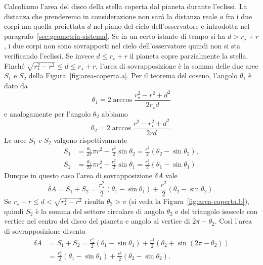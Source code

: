 Calcoliamo l'area del disco della stella coperta dal pianeta durante
l'eclissi. La distanza che prenderemo in considerazione non sarà la distanza
reale $a$ fra i due corpi ma quella proiettata $d$ nel piano del cielo
dell'osservatore e introdotta nel paragrafo~\ref{sec:geometria-sistema}. Se in
un certo istante di tempo si ha $d > r_\star + r$, i due corpi non sono
sovrapposti nel cielo dell'osservatore quindi non si sta verificando
l'eclissi. Se invece $d \leq r_\star + r$ il pianeta copre parzialmente la
stella. Finché $\sqrt{r_\star^2 - r^2} \leq d \leq r_\star + r$, l'area di
sovrapposizione è la somma delle due aree $S_1$ e $S_2$ della
Figura~\ref{fig:area-coperta.a}. Per il teorema del coseno, l'angolo
$\theta_1$ %
è dato da
\begin{equation}
  \theta_1 = 2 \arccos \frac{r_\star^2 - r^2 + d^2}{2r_\star d}
\end{equation}
e analogamente per l'angolo $\theta_2$ abbiamo
\begin{equation}
  \theta_2 = 2 \arccos \frac{r^2 - r_\star^2 + d^2}{2rd}.
\end{equation}
Le aree $S_1$ e $S_2$ valgono rispettivamente
\begin{subequations}
  \begin{align}
    S_1 &= \frac{\theta_2}{2\pi}\pi r^2 - \frac{r^2}{2}\sin\theta_2 =
    \frac{r^2}{2}(\theta_2 - \sin\theta_2), \\
    S_2 &= \frac{\theta_1}{2\pi}\pi r_\star^2 - \frac{r_\star^2}{2}\sin\theta_1
    = \frac{r_\star^2}{2}(\theta_1 - \sin\theta_1).
  \end{align}
\end{subequations}
Dunque in questo caso l'area di sovrapposizione $\delta A$ vale
\begin{equation}
  \delta A = S_1 + S_2 = \frac{r_\star^2}{2}(\theta_1 - \sin\theta_1) +
  \frac{r^2}{2}(\theta_2 - \sin\theta_2).
\end{equation}
Se $r_\star - r \leq d < \sqrt{r_\star^2 - r^2}$ risulta $\theta_2 > \pi$ (si
veda la Figura~\ref{fig:area-coperta.b}), quindi $S_2$ è la somma del settore
circolare di angolo $\theta_2$ e del triangolo isoscele con vertice nel centro
del disco del pianeta e angolo al vertice di $2\pi - \theta_2$. Così l'area di
sovrapposizione diventa
\begin{equation}
  \begin{split}
    \delta A &= S_1 + S_2 = \frac{r_\star^2}{2}(\theta_1 - \sin\theta_1) +
    \frac{r^2}{2}(\theta_2 + \sin(2\pi -\theta_2)) \\
    &= \frac{r_\star^2}{2}(\theta_1 - \sin\theta_1) + \frac{r^2}{2}(\theta_2 -
    \sin\theta_2).
  \end{split}
\end{equation}
